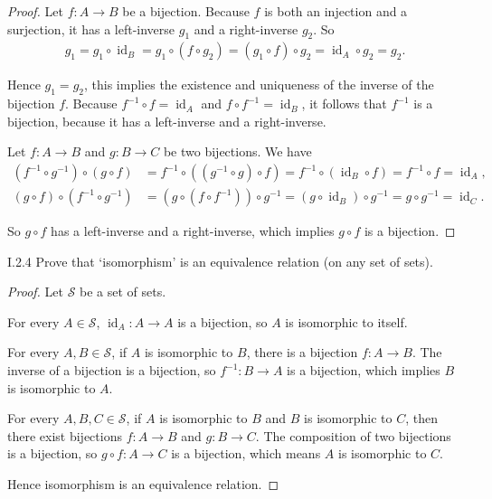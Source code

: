 \begin{proof}
	Let $f: A\to B$ be a bijection. Because $f$ is both an injection and a surjection, it has a left-inverse $g_{1}$ and a right-inverse $g_{2}$. So
	\begin{align*}
		g_{1} = g_{1}\circ \operatorname{id}_{B} = g_{1}\circ (f\circ g_{2}) = (g_{1}\circ f)\circ g_{2} = \operatorname{id}_{A}\circ g_{2} = g_{2}.
	\end{align*}

	Hence $g_{1} = g_{2}$, this implies the existence and uniqueness of the inverse of the bijection $f$. Because $f^{-1}\circ f = \operatorname{id}_{A}$ and $f\circ f^{-1} = \operatorname{id}_{B}$, it follows that $f^{-1}$ is a bijection, because it has a left-inverse and a right-inverse.

	\bigskip
	Let $f: A\to B$ and $g: B\to C$ be two bijections. We have
	\begin{align*}
		(f^{-1}\circ g^{-1})\circ (g\circ f)  & = f^{-1}\circ ((g^{-1}\circ g)\circ f) = f^{-1}\circ (\operatorname{id}_{B}\circ f) = f^{-1}\circ f = \operatorname{id}_{A}, \\
		(g\circ f) \circ (f^{-1}\circ g^{-1}) & = (g\circ (f\circ f^{-1}))\circ g^{-1} = (g\circ\operatorname{id}_{B})\circ g^{-1} = g\circ g^{-1} = \operatorname{id}_{C}.
	\end{align*}

	So $g\circ f$ has a left-inverse and a right-inverse, which implies $g\circ f$ is a bijection.
\end{proof}

\begin{exercise}{I.2.4}
	Prove that `isomorphism' is an equivalence relation (on any set of sets).
\end{exercise}

\begin{proof}
	Let $\mathscr{S}$ be a set of sets.

	For every $A\in\mathscr{S}$, $\operatorname{id}_{A}: A\to A$ is a bijection, so $A$ is isomorphic to itself.

	For every $A, B\in\mathscr{S}$, if $A$ is isomorphic to $B$, there is a bijection $f: A\to B$. The inverse of a bijection is a bijection, so $f^{-1}: B\to A$ is a bijection, which implies $B$ is isomorphic to $A$.

	For every $A, B, C\in\mathscr{S}$, if $A$ is isomorphic to $B$ and $B$ is isomorphic to $C$, then there exist bijections $f: A\to B$ and $g: B\to C$. The composition of two bijections is a bijection, so $g\circ f: A\to C$ is a bijection, which means $A$ is isomorphic to $C$.

	Hence isomorphism is an equivalence relation.
\end{proof}

